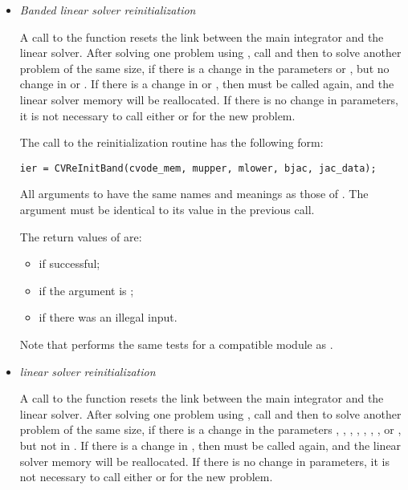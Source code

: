 \begin{itemize}
\item {\em Banded linear solver reinitialization}
  
  A call to the  function resets the link between    
  the main {\cvodes} integrator and the {\cvband} linear solver.        
  After solving one problem using {\cvband}, call  and then 
   to solve another problem of the same size, if     
  there is a change in the  parameters  or ,   
  but no change in  or .  If there is a change in    
   or , then  must be called again, and the    
  linear solver memory will be reallocated.                      
  If there is no change in parameters, it is not necessary to    
  call either  or  for the new problem.

  The call to the {\cvband} reinitialization routine has the following form:
\begin{verbatim}
ier = CVReInitBand(cvode_mem, mupper, mlower, bjac, jac_data);
\end{verbatim}
  All arguments to  have the same names and meanings
  as those of .  The  argument must be identical 
  to its value in the previous  call.                     
  
  The return values of  are:
  \begin{itemize}
  \item {} if successful;
  \item {} if the  argument is ;
  \item {} if there was an illegal input.
  \end{itemize}         
  
  Note that  performs the same tests for a compatible {\nvector} 
  module as .  

\item {\em {\spgmr} linear solver reinitialization}
  
  A call to the  function resets the link between   
  the main {\cvodes} integrator and the {\cvspgmr} linear solver.       
  After solving one problem using {\cvspgmr}, call  and then
   to solve another problem of the same size, if    
  there is a change in the  parameters , ,   
  , , , , , or 
  , but not in .  
  If there is a change in , then  must be      
  called again, and the linear solver memory will be reallocated.
  If there is no change in parameters, it is not necessary to    
  call either  or  for the new problem.


\end{itemize}
